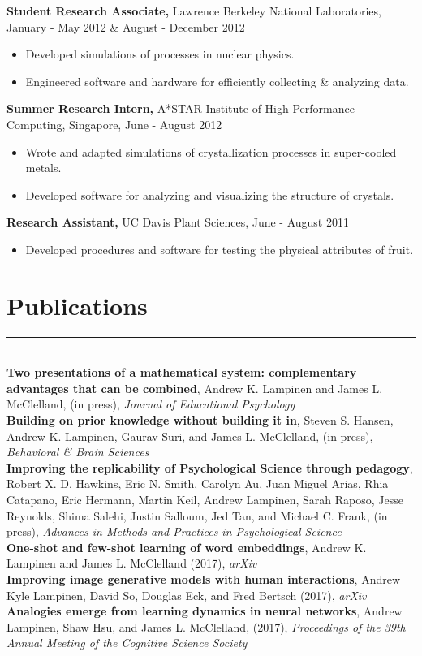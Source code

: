 \documentclass[margin]{res}
\begin{document}
\begin{resume}
 {\bf Student Research Associate,} Lawrence Berkeley National Laboratories, January - May 2012 \& August - December 2012
\begin{itemize} \itemsep -2pt
  \item Developed simulations of processes in nuclear physics. \item Engineered software and hardware for efficiently collecting \& analyzing data. \end{itemize}\vspace{-8pt}
{\bf Summer Research Intern,} A*STAR Institute of High Performance Computing, Singapore, June - August 2012
\begin{itemize} \itemsep -2pt
  \item Wrote and adapted simulations of crystallization processes in super-cooled metals. \item Developed software for analyzing and visualizing the structure of crystals. \end{itemize}\vspace{-8pt}
{\bf Research Assistant,} UC Davis Plant Sciences, June - August 2011
 \begin{itemize} \itemsep -2pt
  \item Developed procedures and software for testing the physical attributes of fruit. \end{itemize}

\vspace{1pt}\section{Publications} \vspace{-15pt} \rule{\textwidth}{0.5pt} \\[3pt]
{\bf Two presentations of a mathematical system: complementary advantages that can be combined}, Andrew K. Lampinen and James L. McClelland, (in press), \textit{Journal of Educational Psychology} \\[3pt]
{\bf Building on prior knowledge without building it in}, Steven S. Hansen, Andrew K. Lampinen, Gaurav Suri, and James L. McClelland, (in press), \textit{Behavioral \& Brain Sciences}  \\[3pt]
{\bf Improving the replicability of Psychological Science through pedagogy}, Robert X. D. Hawkins, Eric N. Smith, Carolyn Au, Juan Miguel Arias, Rhia Catapano, Eric Hermann, Martin Keil, Andrew Lampinen, Sarah Raposo, Jesse Reynolds, Shima Salehi, Justin Salloum, Jed Tan, and Michael C. Frank, (in press), \textit{Advances in Methods and Practices in Psychological Science} \\ [3pt]
{\bf One-shot and few-shot learning of word embeddings}, Andrew K. Lampinen and James L. McClelland (2017), \textit{arXiv} \\ [3pt] 
{\bf Improving image generative models with human interactions}, Andrew Kyle Lampinen, David So, Douglas Eck, and Fred Bertsch (2017), \textit{arXiv} \\ [3pt] 
{\bf Analogies emerge from learning dynamics in neural networks}, Andrew Lampinen, Shaw Hsu, and James L. McClelland, (2017), \textit{Proceedings of the 39th Annual Meeting of the Cognitive Science Society}  


\end{resume}
\end{document}

